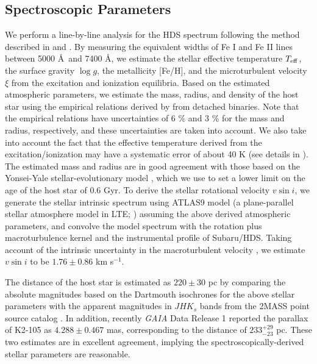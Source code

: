 \documentclass[]{pasj01}
\begin{document}

\subsection{Spectroscopic Parameters}

We perform a line-by-line analysis for the HDS spectrum
following the method described in \citet{2002PASJ...54..451T} and \citet{2005PASJ...57...27T}. 
By measuring the equivalent widths of Fe I and Fe II lines between 5000 \AA\ and 7400 \AA,
we estimate the stellar effective temperature $T_{\rm eff}$, the surface gravity $\log g$,
the metallicity [Fe/H], and the microturbulent velocity $\xi$ from the excitation and ionization equilibria.
Based on the estimated atmospheric parameters, we estimate the mass, radius,
and density of the host star using the empirical relations derived by \citet{2010A&ARv..18...67T}
from detached binaries.
Note that the empirical relations have uncertainties of 6 \% and 3 \% for
the mass and radius, respectively, and these uncertainties are taken into account.
We also take into account the fact that the effective temperature derived from
the excitation/ionization may have a systematic error of about 40 K
(see details in \cite{2010MNRAS.405.1907B,2014ApJ...783....9H}).
The estimated mass and radius are in good agreement with those based on
the Yonsei-Yale stellar-evolutionary model \citep{2001ApJS..136..417Y},
which we use to set a lower limit on the age of the host star of 0.6 Gyr.
To derive the stellar rotational velocity $v \sin i$, we generate the stellar intrinsic 
spectrum using ATLAS9 model (a plane-parallel stellar atmosphere model in LTE; \cite{1993KurCD..13.....K})
assuming the above derived atmospheric parameters, and convolve the model spectrum with
the rotation plus macroturbulence kernel \citep{2005oasp.book.....G} and the instrumental profile of Subaru/HDS.
Taking account of the intrinsic uncertainty in the macroturbulent velocity \citep{2012ApJ...756...66H},
we estimate $v \sin i$ to be $1.76 \pm 0.86$ km s$^{-1}$. 

The distance of the host star is estimated as $220 \pm 30$ pc
by comparing the absolute magnitudes based on the Dartmouth isochrones
\citep{2008ApJS..178...89D} for the above stellar parameters
with the apparent magnitudes in $JHK_s$ bands from
the 2MASS point source catalog \citep{2006AJ....131.1163S}.
In addition, recently {\it GAIA} Data Release 1 \citep{2016arXiv160904153G,2016arXiv160904303L}
reported the parallax of K2-105 as $4.288 \pm 0.467$ mas,
corresponding to the distance of $233_{-23}^{+29}$ pc.
These two estimates are in excellent agreement,
implying the spectroscopically-derived stellar parameters are reasonable.
\end{document}
